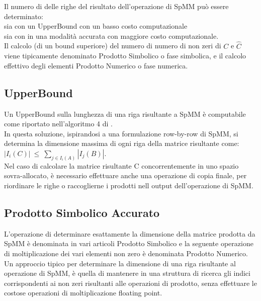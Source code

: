 Il numero di \nnz delle righe del risultato dell'operazione di SpMM può essere determinato:\\ %
sia con un UpperBound con un basso costo computazionale \\ %
sia con in una modalità accurata con maggiore costo computazionale.\\ %

\label{ChExistingTecqs:spMM_symb_num_naming}
Il calcolo (di un bound superiore) del numero di numero di non zeri di $C$ e $\hat{C}$ viene tipicamente 
denominato Prodotto Simbolico o fase simbolica, e il calcolo effettivo degli elementi \nnz Prodotto Numerico o fase numerica.\\

\subsection{UpperBound}	\label{ChExistingTecqs:symbUpperBound}
Un UpperBound sulla lunghezza di una riga risultante a SpMM è computabile come riportato nell'algoritmo 4 di \cite{sysReviewChi}.\\
In questa soluzione, ispirandosi a una formulazione row-by-row di SpMM, 
si determina la dimensione massima di ogni riga della matrice risultante come:\\
$ | I_i(C) |~\leq~\sum\limits_{ j \in I_i(A) }  | I_j(B) | $.\\
\voidLine
Nel caso di calcolare la matrice risultante C concorrentemente in uno spazio sovra-allocato, è necessario effettuare anche una operazione di copia finale,
per riordinare le righe o raccoglierne i \nnz prodotti nell output dell'operazione di SpMM.\\

\subsection{Prodotto Simbolico Accurato}
L'operazione di determinare esattamente la dimensione della matrice prodotta da SpMM
è denominata in vari articoli Prodotto Simbolico e 
la seguente operazione di moltiplicazione dei vari elementi non zero è denominata Prodotto Numerico.\\

Un approccio tipico per determinare la dimensione di una riga risultante al operazione di SpMM, 
è quella di mantenere in una struttura di ricerca gli indici corrispondenti 
ai non zeri risultanti alle operazioni di prodotto, senza effettuare le costose 
operazioni di moltiplicazione floating point.\\

